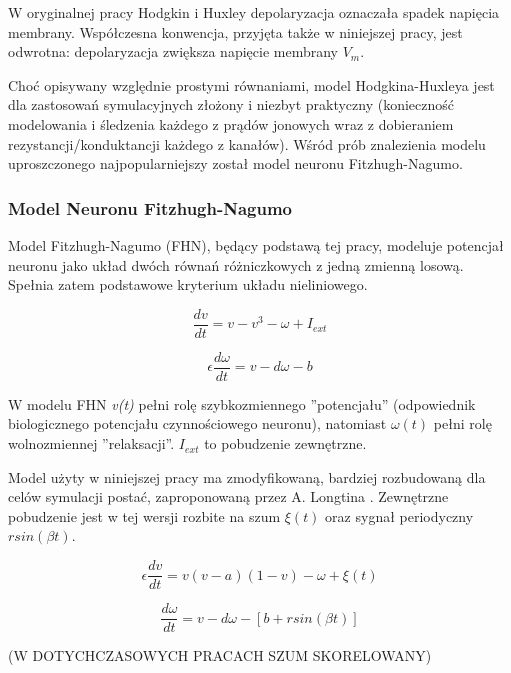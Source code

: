   W oryginalnej pracy Hodgkin i Huxley depolaryzacja oznaczała spadek napięcia membrany. Współczesna konwencja, przyjęta także w niniejszej pracy, jest odwrotna: depolaryzacja zwiększa napięcie membrany $V_{m}$.

  Choć opisywany względnie prostymi równaniami, model Hodgkina-Huxleya jest dla zastosowań symulacyjnych złożony i niezbyt praktyczny (konieczność modelowania i śledzenia każdego z prądów jonowych wraz z dobieraniem rezystancji/konduktancji każdego z kanałów). Wśród prób znalezienia modelu uproszczonego najpopularniejszy został model neuronu Fitzhugh-Nagumo.


  \subsubsection{Model Neuronu Fitzhugh-Nagumo}

  Model Fitzhugh-Nagumo (FHN), będący podstawą tej pracy, modeluje potencjał neuronu jako układ dwóch równań różniczkowych z jedną zmienną losową. Spełnia zatem podstawowe kryterium układu nieliniowego.

  \begin{equation}
    \frac{dv}{dt} = v - v^3 - \omega + I_{ext}
  \end{equation}

  \begin{equation}
    \epsilon \frac{d \omega}{dt} = v - d \omega - b
  \end{equation}

  W modelu FHN \emph{v(t)} pełni rolę szybkozmiennego ''potencjału'' (odpowiednik biologicznego potencjału czynnościowego neuronu), natomiast $\omega (t)$ pełni rolę wolnozmiennej ''relaksacji''. $I_{ext}$ to pobudzenie zewnętrzne.


  Model użyty w niniejszej pracy ma zmodyfikowaną, bardziej rozbudowaną dla celów symulacji postać, zaproponowaną przez A. Longtina \cite{longtin}. Zewnętrzne pobudzenie jest w tej wersji rozbite na szum $\xi(t)$ oraz sygnał periodyczny $r sin(\beta t)$.

  \begin{equation} \label{eq:v}
    \epsilon \frac{dv}{dt} = v(v-a)(1-v)- \omega + \xi(t)
  \end{equation}

  \begin{equation} \label{eq:w}
    \frac{d \omega}{dt} = v - d \omega - [b + r sin(\beta t)]
  \end{equation}

  (W DOTYCHCZASOWYCH PRACACH SZUM SKORELOWANY)

